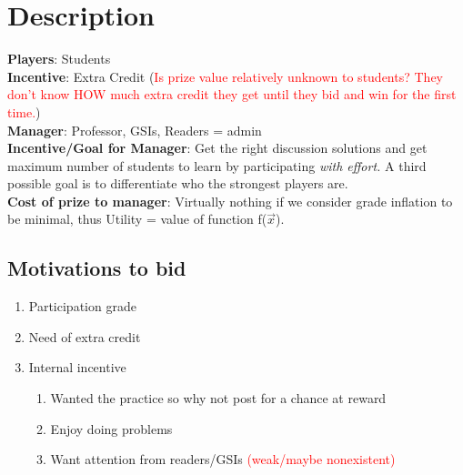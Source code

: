 \documentclass[leqno]{article}
\begin{document}
\section{Description}
\textbf{Players}: Students\\
\textbf{Incentive}: Extra Credit (\textcolor{red}{Is prize value relatively unknown to students? They don't know HOW much extra credit they get until they bid and win for the first time.})\\
\textbf{Manager}: Professor, GSIs, Readers = admin\\
\textbf{Incentive/Goal for Manager}: Get the right discussion solutions and get maximum number of students to learn by participating \emph{with effort.} A third possible goal is to differentiate who the strongest players are.\\
\textbf{Cost of prize to manager}: Virtually nothing if we consider grade inflation to be minimal, thus Utility = value of function f($\overrightarrow{x}$).\\

\subsection{Motivations to bid}
\begin{enumerate}
\item Participation grade
\item Need of extra credit
\item Internal incentive
\begin{enumerate}
\item Wanted the practice so why not post for a chance at reward
\item Enjoy doing problems
\item Want attention from readers/GSIs \textcolor{red}{(weak/maybe nonexistent)}
\end{enumerate}
\end{enumerate}
\end{document}
